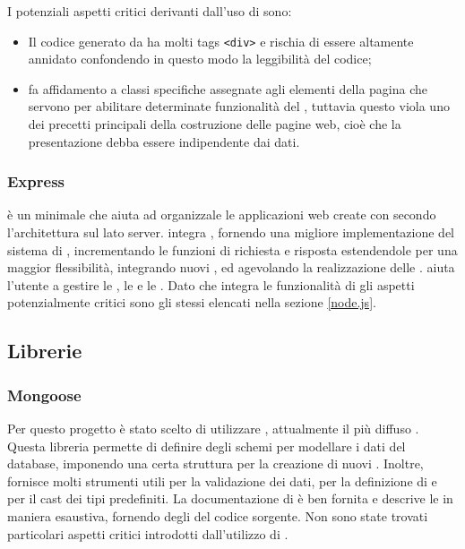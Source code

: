 \documentclass[12pt,a4paper]{article}
\begin{document}
I potenziali aspetti critici derivanti dall'uso di  sono:
\begin{itemize}
	\item Il codice  generato da  ha molti tags \texttt{<div>} e rischia di essere altamente annidato confondendo in questo modo la leggibilità del codice;
	\item {} fa affidamento a classi specifiche assegnate agli elementi della pagina che servono per abilitare determinate funzionalità del , tuttavia questo viola uno dei precetti principali della costruzione delle pagine web, cioè che la presentazione debba essere indipendente dai dati.
\end{itemize}

\subsubsection{Express}\label{express}
 è un  minimale che aiuta ad organizzale le applicazioni web create con  secondo l'architettura  sul lato server.  integra , fornendo una migliore implementazione del sistema di , incrementando le funzioni di richiesta e risposta estendendole per una maggior flessibilità, integrando nuovi , ed agevolando la realizzazione delle .  aiuta l'utente a gestire le , le  e le .
Dato che  integra le funzionalità di  gli aspetti potenzialmente critici sono gli stessi elencati nella sezione \ref{node.js}.


\subsection{Librerie}\label{librery}
\subsubsection{Mongoose}\label{mongoose}
Per questo progetto è stato scelto di utilizzare , attualmente il più diffuso . Questa libreria permette di definire degli schemi per modellare i dati del database, imponendo una certa struttura per la creazione di nuovi . Inoltre, fornisce molti strumenti utili per la validazione dei dati, per la definizione di  e per il cast dei tipi predefiniti.
La documentazione di  è ben fornita e descrive le  in maniera esaustiva, fornendo degli  del codice sorgente.
Non sono state trovati particolari aspetti critici introdotti dall'utilizzo di .
\end{document}
